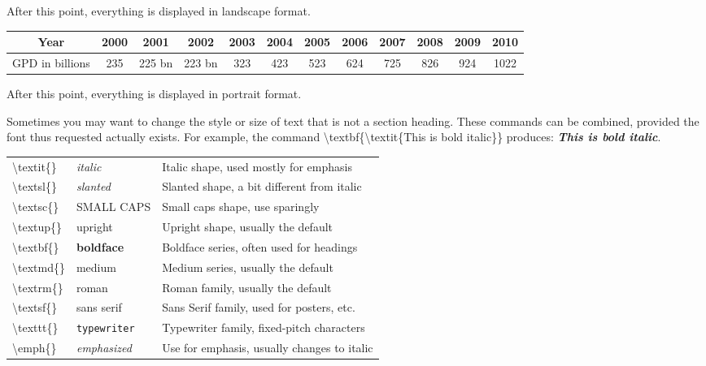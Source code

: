 \documentclass[a4paper,11pt,UTF8,openright]{book}
\begin{document}
\begin{landscape}
	After this point, everything is displayed in landscape format.
	
	\begin{tabular}{|c|c|c|c|c|c|c|c|c|c|c|c|}
		\hline
		Year & 2000 & 2001 & 2002 & 2003 & 2004 & 2005 & 2006 & 2007 & 2008 & 2009 & 2010 \\
		\hline 
		GPD in billions & 235  &  225 bn & 223 bn & 323 & 423  & 523 & 624 & 725 & 826  & 924  & 1022  \\
		\hline 
	\end{tabular}
\end{landscape}

After this point, everything is displayed in portrait format.

Sometimes you may want to change the style or size of text that is not a section heading. These commands can be combined, provided the font thus requested actually exists. For example, the command \textbackslash textbf\{\textbackslash textit\{This is bold italic\}\} produces: \textbf{\textit{This is bold italic}}.

\begin{center}
\begin{tabular}{|p{}p{}p{}|}
	\hline
	\textbackslash textit\{\} & \textit{italic} & Italic shape, used mostly for emphasis\\
	\textbackslash textsl\{\} & \textsl{slanted} & Slanted shape, a bit different from italic\\
	\textbackslash textsc\{\} & \textsc{SMALL CAPS} & Small caps shape, use sparingly\\
	\textbackslash textup\{\} & \textup{upright} & Upright shape, usually the default\\
	\textbackslash textbf\{\} & \textbf{boldface} & Boldface series, often used for headings\\
	\textbackslash textmd\{\} & \textmd{medium} & Medium series, usually the default\\
	\textbackslash textrm\{\} & \textrm{roman} & Roman family, usually the default\\
	\textbackslash textsf\{\} & \textsf{sans serif} & Sans Serif family, used for posters, etc.\\	
	\textbackslash texttt\{\} & \texttt{typewriter} & Typewriter family, fixed-pitch characters\\
	\textbackslash emph\{\} & \emph{emphasized} & Use for emphasis, usually changes to italic\\
	\hline	
\end{tabular}
\end{center}
\end{document}
